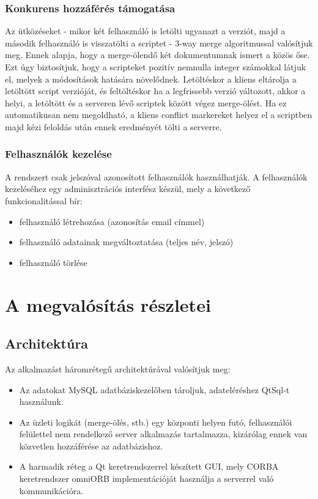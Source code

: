 \documentclass[a4paper,12pt]{article}
\begin{document}
\subsubsection{Konkurens hozzáférés támogatása}

Az ütközéseket - mikor két felhasználó is letölti ugyanazt a verziót, majd a
második felhasználó is visszatölti a scriptet - 3-way merge algoritmussal
valósítjuk meg. Ennek alapja, hogy a merge-ölendő két dokumentumnak ismert a
közös őse. Ezt úgy biztosítjuk, hogy a scripteket pozitív nemnulla integer
számokkal látjuk el, melyek a módosítások hatására növelődnek. Letöltéskor a
kliens eltárolja a letöltött script verzióját, és feltöltéskor ha a legfrissebb
verzió változott, akkor a helyi, a letöltött és a serveren lévő scriptek között
végez merge-ölést. Ha ez automatikusan nem megoldható, a kliens conflict
markereket helyez el a scriptben majd kézi feloldás után ennek eredményét tölti
a serverre.

\subsubsection{Felhasználók kezelése}

A rendszert csak jelszóval azonosított felhasználók használhatják. A
felhasználók kezeléséhez egy adminisztrációs interfész készül, mely a következő
funkcionalitással bír:

\begin{itemize}
\item felhasználó létrehozása (azonosítás email címmel)
\item felhasználó adatainak megváltoztatása (teljes név, jelszó)
\item felhasználó törlése
\end{itemize}

\section{A megvalósítás részletei}

\subsection{Architektúra}

Az alkalmazást háromrétegű architektúrával valósítjuk meg:

\begin{itemize}
\item Az adatokat MySQL adatbáziskezelőben tároljuk, adateléréshez QtSql-t használunk.
\item Az üzleti logikát (merge-ölés, stb.) egy központi helyen futó, felhasználói
felülettel nem rendelkező server alkalmazás tartalmazza, kizárólag ennek van
közvetlen hozzáférése az adatbázishoz.
\item A harmadik réteg a Qt keretrendszerrel készített GUI, mely CORBA
keretrendszer omniORB implementációját használja a serverrel való kommunikációra.
\end{itemize}
\end{document}
